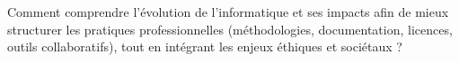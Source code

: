 Comment comprendre l’évolution de l’informatique et ses impacts afin de mieux structurer les pratiques professionnelles (méthodologies, documentation, licences, outils collaboratifs), tout en intégrant les enjeux éthiques et sociétaux ?
